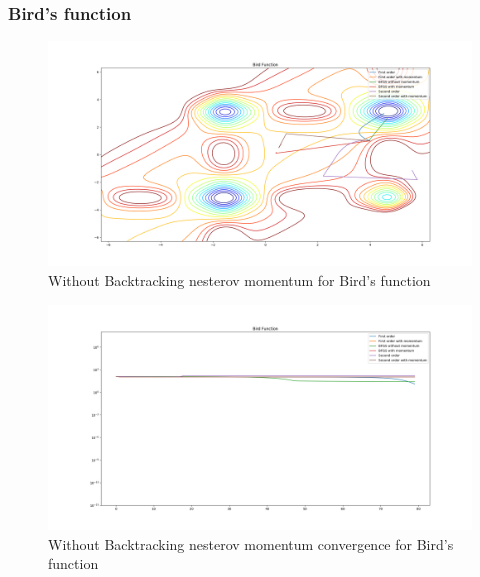 \documentclass{article}
\begin{document}
\subsubsection{Bird's function}
\begin{center}
\begin{figure}[H]
	\includegraphics[width=\linewidth]{../Images/birdnesterov.png}
	\caption{Without Backtracking nesterov momentum for Bird's function}
	\label{fig:Without Backtracking nesterov momentum for Bird's function}
\end{figure}

\begin{figure}[H]
	\includegraphics[width=\linewidth]{../Images/birdnesterov1.png}
	\caption{Without Backtracking nesterov momentum convergence for Bird's function}
	\label{fig:Without Backtracking nesterov momentum convergence for Bird's function}
\end{figure}


\end{center}
\end{document}
